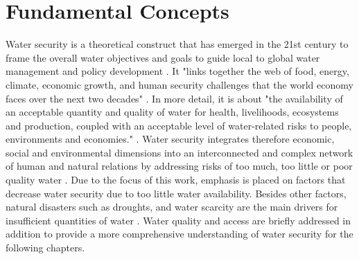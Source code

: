 
\section{Fundamental Concepts}\label{sec:fundamental_concepts}

Water security is a theoretical construct that has emerged in the 21st century to frame the overall water objectives and goals to guide local to global water management and policy development \autocite{sadoffWaterSecurity2020}. It "links together the web of food, energy, climate, economic growth, and human security challenges that the world economy faces over the next two decades" \autocite[5]{wefBubbleCloseBursting2009}. In more detail, it is about "the availability of an acceptable quantity and quality of water for health, livelihoods, ecosystems and production, coupled with an acceptable level of water-related risks to people, environments and economies." \autocite{greySinkSwimWater2007}.\newline
Water security integrates therefore economic, social and environmental dimensions into an interconnected and complex network of human and natural relations by addressing risks of too much, too little or poor quality water \autocite{vanbeekWaterSecurityPutting2014, mishraWaterSecurityChanging2021}. Due to the focus of this work, emphasis is placed on factors that decrease water security due to too little water availability. Besides other factors, natural disasters such as droughts, and water scarcity are the main drivers for insufficient quantities of water \autocite{caretta2022water}. Water quality and access are briefly addressed in addition to provide a more comprehensive understanding of water security for the following chapters.


